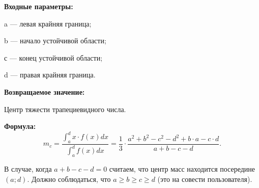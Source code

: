 \textbf{Входные параметры:}
 
a --- левая крайняя граница;
 
b --- начало устойчивой области;
 
с --- конец устойчивой области;
 
d --- правая крайняя граница.

\textbf{Возвращаемое значение:}
 
 Центр тяжести трапециевидного числа.

\textbf{Формула:}
\begin{equation*}
m_c=\dfrac{\int_{a}^{d} x\cdot f(x) dx}{\int_{a}^{d} f(x) dx}  =\dfrac{1}{3}\cdot\dfrac{a^2+b^2-c^2-d^2+b\cdot a-c\cdot d}{a+b-c-d}.
\end{equation*}

В случае, когда $a+b-c-d=0$ считаем, что центр масс находится посередине $(a;d)$. Должно соблюдаться, что $a\geq b \geq c \geq d$ (это на совести пользователя).